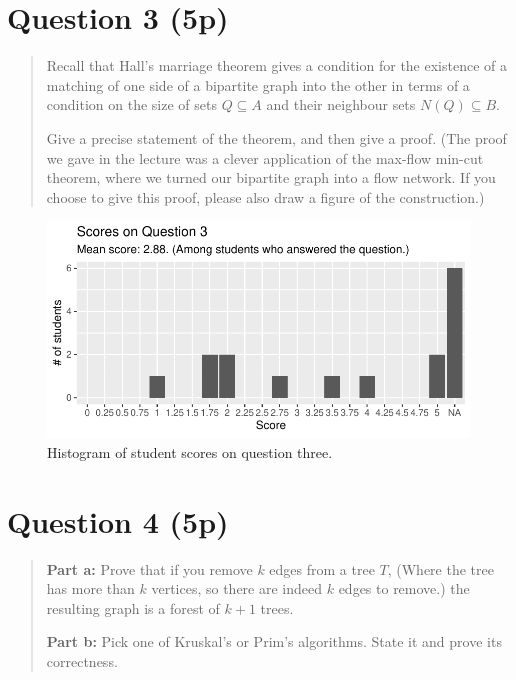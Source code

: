 \documentclass[nobib]{tufte-handout}
\begin{document}
\section{Question 3 (5p)} %

\begin{quotation}
  Recall that Hall's marriage theorem gives a condition for the existence of a matching of one side of a bipartite graph into the other in terms of a condition on the size of sets $Q \subseteq A$ and their neighbour sets $N(Q) \subseteq B$.

  Give a precise statement of the theorem, and then give a proof. (The proof we gave in the lecture was a clever application of the max-flow min-cut theorem, where we turned our bipartite graph into a flow network. If you choose to give this proof, please also draw a figure of the construction.)
\end{quotation}

\begin{figure}[p]
  \centering
  \includegraphics[width = \textwidth]{Q3.pdf}
  \caption[Score histogram for Q3]{Histogram of student scores on question three.}
  \label{fig:Q3}
\end{figure}

\section{Question 4 (5p)} %
\begin{quotation}
  \textbf{Part a:} Prove that if you remove $k$ edges from a tree $T$, (Where the tree has more than $k$ vertices, so there are indeed $k$ edges to remove.) the resulting graph is a forest of $k+1$ trees.
  \vspace{0.5cm}

  \noindent
  \textbf{Part b:} Pick one of Kruskal's or Prim's algorithms. State it and prove its correctness.
\end{quotation}
\end{document}
